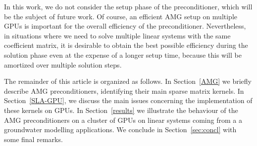 In this work, we do not consider the setup phase of the preconditioner,
which will be the subject of future work. 
Of course, an efficient AMG setup on multiple GPUs is important for the overall efficiency of the
preconditioner. Nevertheless, in situations where we need to solve multiple
linear systems with the same coefficient matrix, it is desirable to obtain
the best possible efficiency during the solution phase even at the expense of a
longer setup time, because this will be amortized over multiple
solution steps.

The remainder of this article is organized as follows. In Section~\ref{AMG} we briefly describe AMG preconditioners,
identifying their main sparse matrix kernels. In Section~\ref{SLA-GPU}, we discuss the main issues
concerning the implementation of these kernels on GPUs. In Section~\ref{results} we illustrate the
behaviour of the AMG preconditioners on a cluster of GPUs on linear systems coming from a
a groundwater modelling applications. 
We conclude in Section~\ref{sec:concl} with some final remarks.  